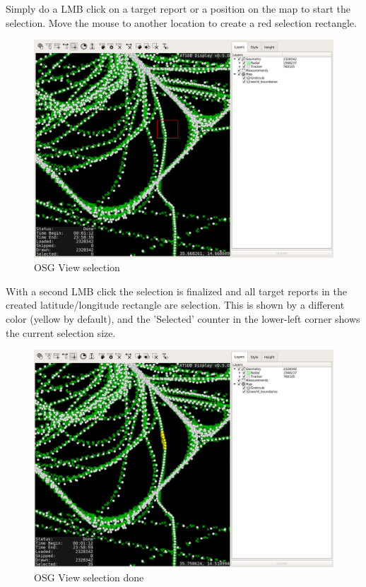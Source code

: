 Simply do a LMB click on a target report or a position on the map to start the selection. Move the mouse to another location to create a red selection rectangle.

\begin{figure}[H]
    \hspace*{-2.5cm}
    \includegraphics[width=19cm,frame]{figures/osgview_select1.png}
  \caption{OSG View selection}
\end{figure}

With a second LMB click the selection is finalized and all target reports in the created latitude/longitude rectangle are selection. This is shown by a different color (yellow by default), and the 'Selected' counter in the lower-left corner shows the current selection size.

\begin{figure}[H]
    \hspace*{-2.5cm}
    \includegraphics[width=19cm,frame]{figures/osgview_select2.png}
  \caption{OSG View selection done}
\end{figure}

